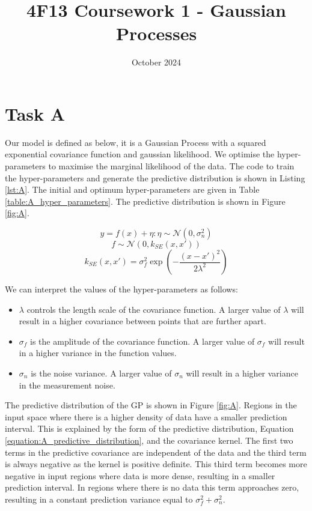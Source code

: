 \documentclass[11pt]{article}
\title{\vspace{-2cm}4F13 Coursework 1 - Gaussian Processes}
\author{}
\date{October 2024}
\begin{document}
\maketitle
\section{Task A}

Our model is defined as below, it is a Gaussian Process with a squared exponential covariance function and gaussian likelihood. We optimise the hyper-parameters to maximise the marginal likelihood of the data. The code to train the hyper-parameters and generate the predictive distribution is shown in Listing \ref{lst:A}. The initial and optimum hyper-parameters are given in Table \ref{table:A_hyper_parameters}. The predictive distribution is shown in Figure \ref{fig:A}.

\[y = f(x) + \eta : \eta \sim \mathcal{N}(0, \sigma_n^2)\]
\[f \sim \mathcal{N}(0, k_{SE}(x, x'))\]
\[k_{SE}(x,x') = \sigma_f^2 \exp(-\frac{(x-x')^2}{2\lambda^2})\]

We can interpret the values of the hyper-parameters as follows:
\begin{itemize}
    \item $\lambda$ controls the length scale of the covariance function. A larger value of $\lambda$ will result in a higher covariance between points that are further apart.
    \item $\sigma_f$ is the amplitude of the covariance function. A larger value of $\sigma_f$ will result in a higher variance in the function values.
    \item $\sigma_n$ is the noise variance. A larger value of $\sigma_n$ will result in a higher variance in the measurement noise.
\end{itemize}

The predictive distribution of the GP is shown in Figure \ref{fig:A}. Regions in the input space where there is a higher density of data have a smaller prediction interval. This is explained by the form of the predictive distribution, Equation \ref{equation:A_predictive_distribution}, and the covariance kernel. The first two terms in the predictive covariance are independent of the data and the third term is always negative as the kernel is positive definite. This third term becomes more negative in input regions where data is more dense, resulting in a smaller prediction interval. In regions where there is no data this term approaches zero, resulting in a constant prediction variance equal to $\sigma_f^2 + \sigma_n^2$.
\end{document}
